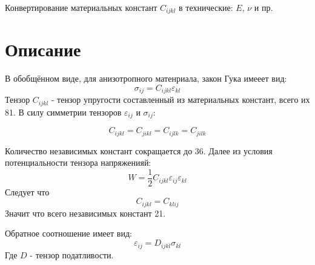{~}\bigskip
\begin{center}
    \Huge{
    Конвертирование материальных констант 
$C_{ijkl}$ 
в технические: 
$E$, $\nu$
и пр.}
\end{center}

\section{Описание}
В обобщённом виде, для анизотропного матенриала, закон Гука имееет вид:
\begin{equation}
    \label{CMCTT:eq1}
    \sigma_{ij} = C_{ijkl}\varepsilon_{kl}
\end{equation}
Тензор 
$C_{ijkl}$ 
- тензор упругости составленный из материальных констант, всего их 81.
В силу симметрии тензоров 
$\varepsilon_{ij}$ 
и 
$\sigma_{ij}$:

$$
C_{ijkl} = C_{jikl} = C_{ijlk} = C_{jilk} 
$$

Количество независимых констант сокращается до 36. Далее из условия потенциальности тензора напряженияй:
$$
W=\frac{1}{2}C_{ijkl}\varepsilon_{ij}\varepsilon_{kl}
$$
Следует что 
$$
C_{ijkl} = C_{klij}
$$
Значит что всего независимых констант 21.

Обратное соотношение имеет вид:
\begin{equation}
    \label{CMCTT:eq2}
\varepsilon_{ij} = D_{ijkl}\sigma_{kl}
\end{equation}
Где 
$D$ 
- тензор податливости.

